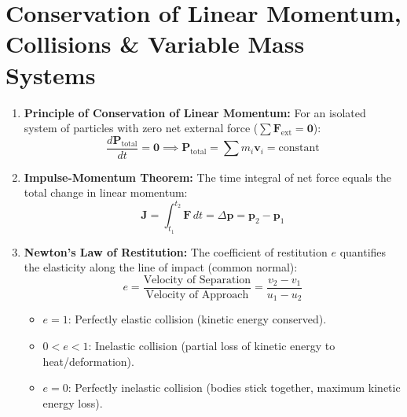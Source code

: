 \documentclass[10pt,twoside,openright]{book}
\begin{document}
\section{Conservation of Linear Momentum, Collisions \& Variable Mass Systems}

\begin{conceptbox}
\begin{enumerate}[leftmargin=*]
  \item \textbf{Principle of Conservation of Linear Momentum:} For an isolated system of particles with zero net external force ($\sum \mathbf{F}_{\text{ext}} = \mathbf{0}$):
  \begin{equation}
    \frac{d\mathbf{P}_{\text{total}}}{dt} = \mathbf{0} \implies \mathbf{P}_{\text{total}} = \sum m_i \mathbf{v}_i = \text{constant}
  \end{equation}
  \item \textbf{Impulse-Momentum Theorem:} The time integral of net force equals the total change in linear momentum:
  \begin{equation}
    \mathbf{J} = \int_{t_1}^{t_2} \mathbf{F}\,dt = \Delta\mathbf{p} = \mathbf{p}_2 - \mathbf{p}_1
  \end{equation}
  \item \textbf{Newton's Law of Restitution:} The coefficient of restitution $e$ quantifies the elasticity along the line of impact (common normal):
  \begin{equation}
    e = \frac{\text{Velocity of Separation}}{\text{Velocity of Approach}} = \frac{v_2 - v_1}{u_1 - u_2}
  \end{equation}
  \begin{itemize}
    \item $e = 1$: Perfectly elastic collision (kinetic energy conserved).
    \item $0 < e < 1$: Inelastic collision (partial loss of kinetic energy to heat/deformation).
    \item $e = 0$: Perfectly inelastic collision (bodies stick together, maximum kinetic energy loss).
  \end{itemize}
\end{enumerate}
\end{conceptbox}
\end{document}
